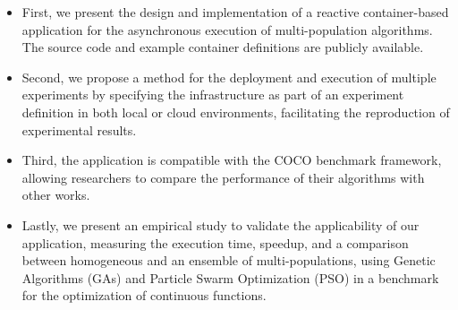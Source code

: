 \documentclass[review]{elsarticle}
\begin{document}
\begin{itemize}
    \item First, we present the design and implementation of a reactive 
    container-based application for the asynchronous execution of multi-population 
    algorithms. The source code and example container definitions are
    publicly available. %
    \item Second, we propose a method for the deployment and execution of 
    multiple experiments by specifying the infrastructure as part of an 
    experiment definition in both local or cloud environments,
    facilitating the reproduction of experimental results. %
    \item Third, the application is compatible with the COCO benchmark 
    framework, allowing researchers to compare the performance of their 
    algorithms with other works. %
    \item Lastly, we present an empirical study to validate the 
    applicability of our application,  measuring the execution time, 
    speedup, and a comparison between homogeneous and an ensemble of 
    multi-populations, using Genetic Algorithms (GAs) and Particle 
    Swarm Optimization (PSO) in a benchmark for the optimization of 
    continuous functions. %
\end{itemize}


\end{document}
